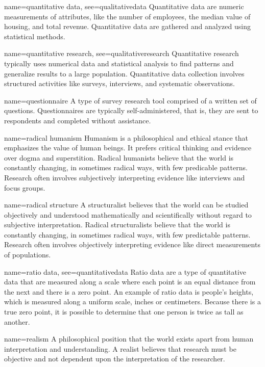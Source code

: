 {name={quantitative data},
	see={qualitativedata}}
{%
	Quantitative data are numeric measurements of attributes, like the number of employees, the median value of housing, and total revenue. Quantitative data are gathered and analyzed using statistical methods.
}

{name={quantitative research},
	see={qualitativeresearch}}
{%
	Quantitative research typically uses numerical data and statistical analysis to find patterns and generalize results to a large population. Quantitative data collection involves structured activities like surveys, interviews, and systematic observations.
}

{name={questionnaire}}
{%
	A type of survey research tool comprised of a written set of questions. Questionnaires are typically self-administered, that is, they are sent to respondents and completed without assistance.
}

{name={radical humanism}}
{%
	Humanism is a philosophical and ethical stance that emphasizes the value of human beings. It prefers critical thinking and evidence over dogma and superstition. Radical humanists believe that the world is constantly changing, in sometimes radical ways, with few predicable patterns. Research often involves subjectively interpreting evidence like interviews and focus groups.
}

{name={radical structure}}
{%
	A structuralist believes that the world can be studied objectively and understood mathematically and scientifically without regard to subjective interpretation. Radical structuralists believe that the world is constantly changing, in sometimes radical ways, with few predictable patterns. Research often involves objectively interpreting evidence like direct measurements of populations.
}

{name={ratio data},
	see={quantitativedata}}
{%
	Ratio data are a type of quantitative data that are measured along a scale where each point is an equal distance from the next and there is a zero point. An example of ratio data is people's heights, which is measured along a uniform scale, \eg inches or centimeters. Because there is a true zero point, it is possible to determine that one person is twice as tall as another.
}

{name={realism}}
{%
	A philosophical position that the world exists apart from human interpretation and understanding. A realist believes that research must be objective and not dependent upon the interpretation of the researcher.
}

